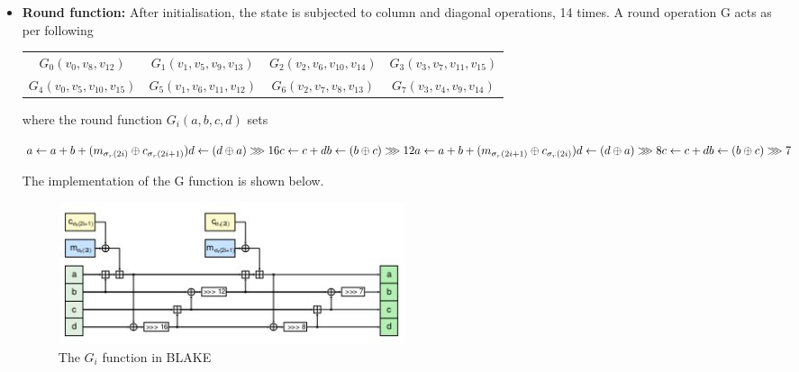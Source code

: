 \begin{itemize}
    \item {\bf Round function:} After initialisation, the state is subjected to column and diagonal operations, 14
    times. A round operation G acts as per following

    \begin{table}
      \begin{center}
        \begin{tabular}{ *{4}{c}}
        $ G_{0}(v_{0}, v_{8}, v_{12})$ & $G_{1}(v_{1}, v_{5}, v_{9}, v_{13})$ & $G_{2}(v_{2}, v_{6}, v_{10}, v_{14})$ & $G_{3}(v_{3}, v_{7}, v_{11}, v_{15}) $\\
 $G_{4}(v_{0}, v_{5}, v_{10}, v_{15})$ & $G_{5}(v_{1}, v_{6}, v_{11}, v_{12})$ & $G_{6}(v_{2}, v_{7}, v_{8}, v_{13})$ & $G_{7}(v_{3}, v_{4}, v_{9}, v_{14})$
        \end{tabular}
      \end{center}
    \end{table}


    where the round function $G_{i}(a, b, c, d)$ sets

    \newpage
    
    $
    a \gets a + b + (m_{\sigma_{r}(2i)} \oplus c_{\sigma_{r}(2i + 1)}) \\
    d \gets (d \oplus a) \ggg 16 \\
    c \gets c + d \\
    b \gets (b \oplus c) \ggg 12 \\
    a \gets a + b + (m_{\sigma_{r}(2i + 1)} \oplus c_{\sigma_{r}(2i)}) \\
    d \gets (d \oplus a) \ggg 8 \\
    c \gets c + d \\
    b \gets (b \oplus c) \ggg 7
    $

    The implementation of the G function is shown below.
    \begin{figure}[h]
      \begin{center}
        \includegraphics[width=4in]{blakeGfunction.jpg}
      \end{center}
      \caption{The $G_{i}$ function in BLAKE\cite{00002}}
      \label{fig:lab}
    \end{figure}


\end{itemize}
